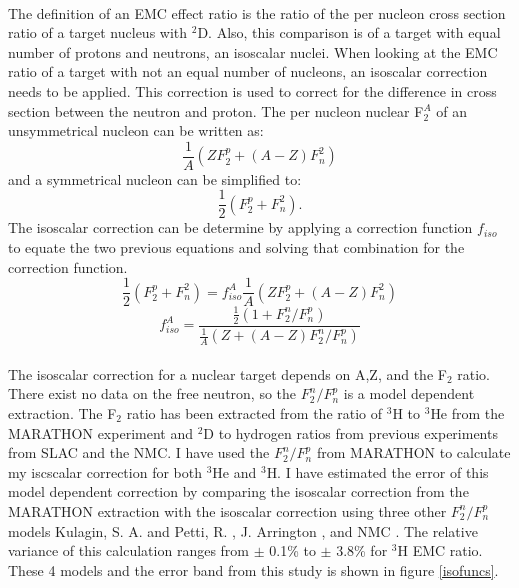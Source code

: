 	\paragraph{}The definition of an EMC effect ratio is the ratio of the per nucleon cross section ratio of a target nucleus with $^2$D. Also,  this comparison is of a target with equal number of protons and neutrons, an isoscalar nuclei. When looking at the EMC ratio of a target with not an equal number of nucleons, an isoscalar correction needs to be applied. This correction is used to correct for the difference in cross section between the neutron and proton. The per nucleon nuclear F$_2^A $ of an unsymmetrical nucleon can be written as:
	\begin{equation}
	\frac{1}{A}\left(ZF^p_2 + \left(A-Z\right)F^2_n\right)\nonumber
	\end{equation}
	and a symmetrical nucleon can be simplified to:
	\begin{equation}
		\frac{1}{2}\left(F^p_2 + F^2_n\right).\nonumber
	\end{equation}	
	The isoscalar correction can be determine by applying a correction function $f_{iso}$ to equate the two previous equations and solving that combination for the correction function.
	\begin{equation}
		\frac{1}{2}\left(F^p_2 + F^2_n\right) =  f^A_{iso}\frac{1}{A}\left(ZF^p_2 + \left(A-Z\right)F^2_n\right)\nonumber
	\end{equation}
	\begin{equation}
	f^A_{iso} = \frac{\frac{1}{2}\left(1+F^n_2/F^p_n\right)}{\frac{1}{A}\left(Z +(A-Z)F^n_2/F^p_n\right)} \label{isoC}
	\end{equation}
	\paragraph{}The isoscalar correction for a nuclear target depends on A,Z, and the F$_2$ ratio. There exist no data on the free neutron, so the $F^n_2/F^p_n$ is a model dependent extraction. The  F$_2$ ratio has been extracted from the ratio of $^3$H to $^3$He from the MARATHON experiment and $^2$D to hydrogen ratios from previous experiments from SLAC and the NMC. I have used the $F^n_2/F^p_n$ from MARATHON to calculate my iscscalar correction for both $^3$He and $^3$H. I have estimated the error of this model dependent correction by comparing the isoscalar correction from the MARATHON extraction with the isoscalar correction using three other $F^n_2/F^p_n$ models Kulagin, S. A. and Petti, R. \cite{kpmodel}, J. Arrington \cite{JA_FR}, and NMC \cite{NMC_ratio}. The relative variance of this calculation ranges from $\pm$ 0.1\% to $\pm$ 3.8\% for $^3$H EMC ratio. These 4 models and the error band from this study is shown in figure \ref{isofuncs}.

